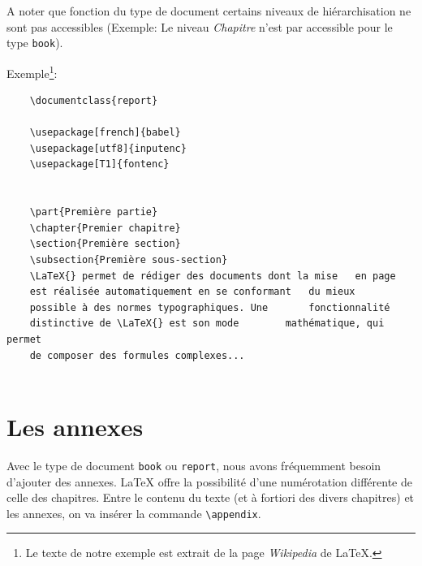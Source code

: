 A noter que fonction du type de document certains niveaux de hiérarchisation ne sont pas accessibles (Exemple: Le niveau \textit{Chapitre} n'est par accessible pour le type \texttt{book}).
\medskip

Exemple\footnote{Le texte de notre exemple est extrait de la page \textit{Wikipedia} de \LaTeX .}:
\begin{verbatim}
    \documentclass{report}

    \usepackage[french]{babel}
    \usepackage[utf8]{inputenc}
    \usepackage[T1]{fontenc}
    
    
    \part{Première partie}
    \chapter{Premier chapitre}
    \section{Première section}
    \subsection{Première sous-section}
    \LaTeX{} permet de rédiger des documents dont la mise 	en page 
    est réalisée automatiquement en se conformant 	du mieux 
    possible à des normes typographiques. Une 		fonctionnalité 
    distinctive de \LaTeX{} est son mode 		mathématique, qui permet 
    de composer des formules complexes... 
    
\end{verbatim}
\bigskip

\section{Les annexes}
Avec le type de document \texttt{book} ou \texttt{report}, nous avons fréquemment besoin d'ajouter des annexes. \LaTeX{} offre la possibilité d'une numérotation différente de celle des chapitres. Entre le contenu du texte (et à fortiori des divers chapitres) et les annexes, on va insérer la commande \verb|\appendix|.
\medskip

